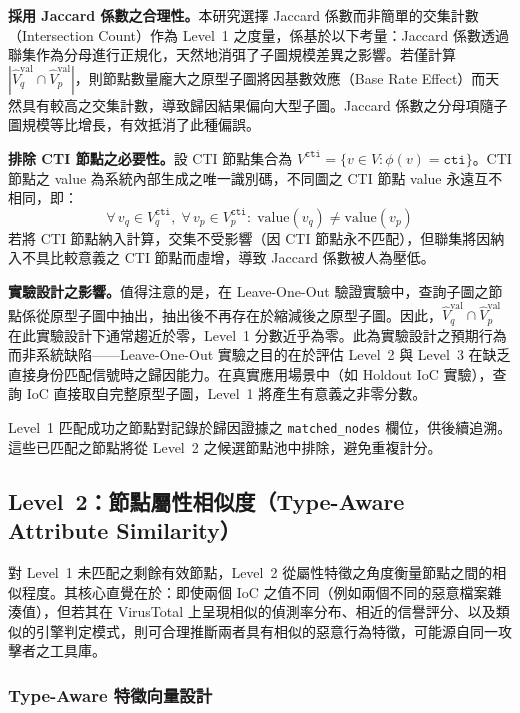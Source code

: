 \begin{ZhChapter}
\textbf{採用 Jaccard 係數之合理性。}本研究選擇 Jaccard 係數而非簡單的交集計數（Intersection Count）作為 Level~1 之度量，係基於以下考量：Jaccard 係數透過聯集作為分母進行正規化，天然地消弭了子圖規模差異之影響。若僅計算 $|\hat{V}_q^{\text{val}} \cap \hat{V}_p^{\text{val}}|$，則節點數量龐大之原型子圖將因基數效應（Base Rate Effect）而天然具有較高之交集計數，導致歸因結果偏向大型子圖。Jaccard 係數之分母項隨子圖規模等比增長，有效抵消了此種偏誤。

\textbf{排除 CTI 節點之必要性。}設 CTI 節點集合為 $V^{\texttt{cti}} = \{v \in V : \phi(v) = \texttt{cti}\}$。CTI 節點之 value 為系統內部生成之唯一識別碼，不同圖之 CTI 節點 value 永遠互不相同，即：
\begin{equation}
    \forall\, v_q \in V_q^{\texttt{cti}},\; \forall\, v_p \in V_p^{\texttt{cti}}:\; \text{value}(v_q) \neq \text{value}(v_p)
    \label{eq:cti-exclusion}
\end{equation}
若將 CTI 節點納入計算，交集不受影響（因 CTI 節點永不匹配），但聯集將因納入不具比較意義之 CTI 節點而虛增，導致 Jaccard 係數被人為壓低。

\textbf{實驗設計之影響。}值得注意的是，在 Leave-One-Out 驗證實驗中，查詢子圖之節點係從原型子圖中抽出，抽出後不再存在於縮減後之原型子圖。因此，$\hat{V}_q^{\text{val}} \cap \hat{V}_p^{\text{val}}$ 在此實驗設計下通常趨近於零，Level~1 分數近乎為零。此為實驗設計之預期行為而非系統缺陷——Leave-One-Out 實驗之目的在於評估 Level~2 與 Level~3 在缺乏直接身份匹配信號時之歸因能力。在真實應用場景中（如 Holdout IoC 實驗），查詢 IoC 直接取自完整原型子圖，Level~1 將產生有意義之非零分數。

Level~1 匹配成功之節點對記錄於歸因證據之 \texttt{matched\_nodes} 欄位，供後續追溯。這些已匹配之節點將從 Level~2 之候選節點池中排除，避免重複計分。


\subsection{Level~2：節點屬性相似度（Type-Aware Attribute Similarity）}
\label{subsec:level2}

對 Level~1 未匹配之剩餘有效節點，Level~2 從屬性特徵之角度衡量節點之間的相似程度。其核心直覺在於：即使兩個 IoC 之值不同（例如兩個不同的惡意檔案雜湊值），但若其在 VirusTotal 上呈現相似的偵測率分布、相近的信譽評分、以及類似的引擎判定模式，則可合理推斷兩者具有相似的惡意行為特徵，可能源自同一攻擊者之工具庫。

\subsubsection{Type-Aware 特徵向量設計}


\end{ZhChapter}
